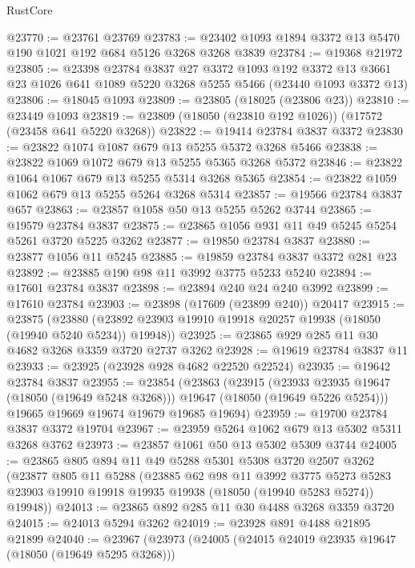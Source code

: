 \begin{lexlean}{RustCore}
\begin{coremodule}
@23770 := @23761 @23769
@23783 := @23402 @1093 @1894 @3372 @13 @5470 @190 @1021 @192 @684 @5126 @3268 @3268 @3839
@23784 := @19368 @21972
@23805 := @23398
    @23784
    @3837
    @27
    @3372
    @1093
    @192
    @3372
    @13
    @3661
    @23
    @1026
    @641
    @1089
    @5220
    @3268
    @5255
    @5466
    (@23440 @1093 @3372 @13)
@23806 := @18045 @1093
@23809 := @23805 (@18025 (@23806 @23))
@23810 := @23449 @1093
@23819 := @23809 (@18050 (@23810 @192 @1026)) (@17572 (@23458 @641 @5220 @3268))
@23822 := @19414 @23784 @3837 @3372
@23830 := @23822 @1074 @1087 @679 @13 @5255 @5372 @3268 @5466
@23838 := @23822 @1069 @1072 @679 @13 @5255 @5365 @3268 @5372
@23846 := @23822 @1064 @1067 @679 @13 @5255 @5314 @3268 @5365
@23854 := @23822 @1059 @1062 @679 @13 @5255 @5264 @3268 @5314
@23857 := @19566 @23784 @3837 @657
@23863 := @23857 @1058 @50 @13 @5255 @5262 @3744
@23865 := @19579 @23784 @3837
@23875 := @23865 @1056 @931 @11 @49 @5245 @5254 @5261 @3720 @5225 @3262
@23877 := @19850 @23784 @3837
@23880 := @23877 @1056 @11 @5245
@23885 := @19859 @23784 @3837 @3372 @281 @23
@23892 := @23885 @190 @98 @11 @3992 @3775 @5233 @5240
@23894 := @17601 @23784 @3837
@23898 := @23894 @240 @24 @240 @3992
@23899 := @17610 @23784
@23903 := @23898 (@17609 (@23899 @240)) @20417
@23915 := @23875
    (@23880 (@23892 @23903 @19910 @19918 @20257 @19938 (@18050 (@19940 @5240 @5234)) @19948))
@23925 := @23865 @929 @285 @11 @30 @4682 @3268 @3359 @3720 @2737 @3262
@23928 := @19619 @23784 @3837 @11
@23933 := @23925 (@23928 @928 @4682 @22520 @22524)
@23935 := @19642 @23784 @3837
@23955 := @23854
    (@23863
      (@23915
        (@23933 @23935 @19647 (@18050 (@19649 @5248 @3268)))
        @19647
        (@18050 (@19649 @5226 @5254)))
      @19665
      @19669
      @19674
      @19679
      @19685
      @19694)
@23959 := @19700 @23784 @3837 @3372 @19704
@23967 := @23959 @5264 @1062 @679 @13 @5302 @5311 @3268 @3762
@23973 := @23857 @1061 @50 @13 @5302 @5309 @3744
@24005 := @23865
    @805
    @894
    @11
    @49
    @5288
    @5301
    @5308
    @3720
    @2507
    @3262
    (@23877
      @805
      @11
      @5288
      (@23885
        @62
        @98
        @11
        @3992
        @3775
        @5273
        @5283
        @23903
        @19910
        @19918
        @19935
        @19938
        (@18050 (@19940 @5283 @5274))
        @19948))
@24013 := @23865 @892 @285 @11 @30 @4488 @3268 @3359 @3720
@24015 := @24013 @5294 @3262
@24019 := @23928 @891 @4488 @21895 @21899
@24040 := @23967
    (@23973
      (@24005
        (@24015 @24019 @23935 @19647 (@18050 (@19649 @5295 @3268)))

\end{coremodule}
\end{lexlean}
